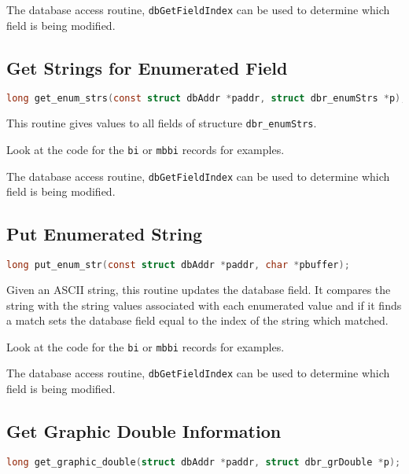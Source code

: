 The database access routine, \verb|dbGetFieldIndex| can be used to determine which field is being modified.

\subsection{Get Strings for Enumerated Field}

\begin{lstlisting}[language=C]
long get_enum_strs(const struct dbAddr *paddr, struct dbr_enumStrs *p);
\end{lstlisting}

This routine gives values to all fields of structure \verb|dbr_enumStrs|.

Look at the code for the \verb|bi| or \verb|mbbi| records for examples.

The database access routine, \verb|dbGetFieldIndex| can be used to determine which field is being modified.

\subsection{Put Enumerated String}

\begin{lstlisting}[language=C]
long put_enum_str(const struct dbAddr *paddr, char *pbuffer);
\end{lstlisting}

Given an ASCII string, this routine updates the database field.
It compares the string with the string values associated with each enumerated value and if it finds a match sets the database field equal to the index of the string which matched.

Look at the code for the \verb|bi| or \verb|mbbi| records for examples.

The database access routine, \verb|dbGetFieldIndex| can be used to determine which field is being modified.

\subsection{Get Graphic Double Information}

\begin{lstlisting}[language=C]
long get_graphic_double(struct dbAddr *paddr, struct dbr_grDouble *p);
\end{lstlisting}

